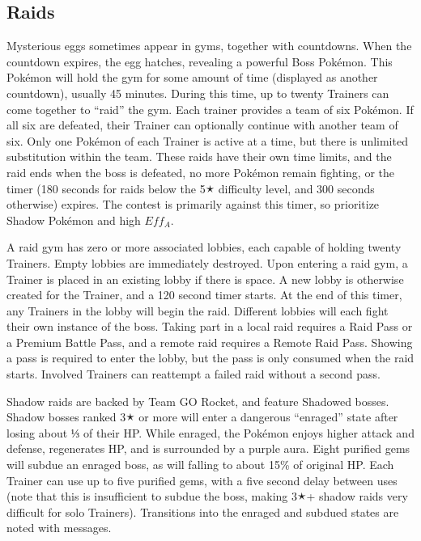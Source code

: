 \subsection{Raids\label{sec:raids}}
Mysterious eggs sometimes appear in gyms, together with countdowns.
When the countdown expires, the egg hatches, revealing a powerful Boss Pokémon.
This Pokémon will hold the gym for some amount of time (displayed as another countdown), usually 45 minutes.
During this time, up to twenty Trainers can come together to ``raid'' the gym.
Each trainer provides a team of six Pokémon.
If all six are defeated, their Trainer can optionally continue with another team of six.
Only one Pokémon of each Trainer is active at a time, but there is unlimited substitution within the team.
These raids have their own time limits, and the raid ends when the boss is defeated, no more Pokémon remain fighting,
  or the timer (180 seconds for raids below the 5🟉 difficulty level, and 300 seconds otherwise) expires.
The contest is primarily against this timer, so prioritize Shadow Pokémon and high $Eff_A$.

A raid gym has zero or more associated lobbies, each capable of holding twenty Trainers.
Empty lobbies are immediately destroyed.
Upon entering a raid gym, a Trainer is placed in an existing lobby if there is space.
A new lobby is otherwise created for the Trainer, and a 120 second timer starts.
At the end of this timer, any Trainers in the lobby will begin the raid.
Different lobbies will each fight their own instance of the boss.
Taking part in a local raid requires a Raid Pass or a Premium Battle Pass,
  and a remote raid requires a Remote Raid Pass.
Showing a pass is required to enter the lobby, but the pass is only consumed when the raid starts.
Involved Trainers can reattempt a failed raid without a second pass.

Shadow raids are backed by Team GO Rocket, and feature Shadowed bosses.
Shadow bosses ranked 3🟉 or more will enter a dangerous ``enraged'' state after losing about ⅓ of their HP.
While enraged, the Pokémon enjoys higher attack and defense, regenerates HP, and is surrounded by a purple aura.
Eight purified gems will subdue an enraged boss, as will falling to about 15\% of original HP.
Each Trainer can use up to five purified gems, with a five second delay between uses
 (note that this is insufficient to subdue the boss, making 3🟉+ shadow raids
 very difficult for solo Trainers).
Transitions into the enraged and subdued states are noted with messages.

